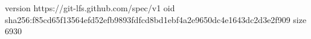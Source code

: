 version https://git-lfs.github.com/spec/v1
oid sha256:f85cd65f13564efd52efb9893fdfcd8bd1ebf4a2e9650dc4e1643dc2d3e2f909
size 6930
